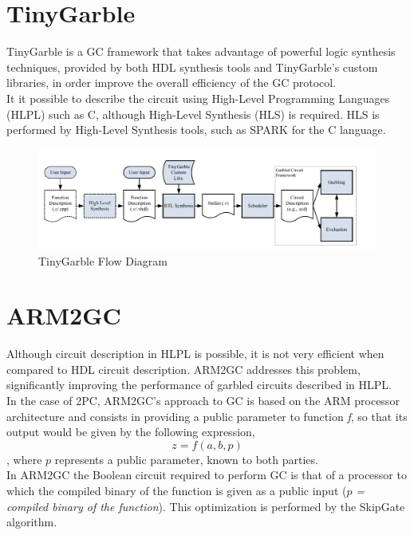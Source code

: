 \section{TinyGarble}
TinyGarble is a GC framework that takes advantage of powerful logic synthesis techniques, provided by both HDL synthesis tools
and TinyGarble's custom libraries, in order improve the overall efficiency of the GC protocol.\\
It it possible to describe the circuit using High-Level Programming Languages (HLPL) such as C, although High-Level Synthesis (HLS) is required. HLS is performed by High-Level Synthesis tools, such as SPARK for the C language.

\renewcommand{\figurename}{Figure}
\begin{figure}[H]
\centering
\includegraphics[width=.9\linewidth]{./figures/mpc/tinygarble_flow_diagram}
\caption{TinyGarble Flow Diagram}
\label{fig:tgdiagram}
\end{figure}

\section{ARM2GC}
Although circuit description in HLPL is possible, it is not very efficient when compared to HDL circuit description. ARM2GC addresses this problem, significantly improving the performance of garbled circuits described in HLPL.\\
In the case of 2PC, ARM2GC's approach to GC is based on the ARM processor architecture and consists in providing a public parameter to function \textit{f}, so that its output would be given by the following expression,
\begin{equation}\label{eq:arm2gc}
z = f(a,b,p)
\end{equation}
, where $p$ represents a public parameter, known to both parties.\\
In ARM2GC the Boolean circuit required to perform GC is that of a processor to which the compiled binary of the function is given as a public input ($p$\textit{ = compiled binary of the function}). This optimization is performed by the SkipGate algorithm.

 